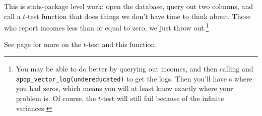 This is stats-package level work: open the database, query out two
columns, and call a $t$-test function that does things
we don't have time to think about. Those who report incomes less than or
equal to zero, we just throw out.\footnote{You may be able to do better
by querying out incomes, and then calling
     and {\tt
    apop\_vector\_log(undereducated)} to get the logs. Then you'll have
    s where you had zeros, which means you will at least
    know exactly where your problem is. Of course, the $t$-test will
    still fail because of the infinite variances.}

See page \pageref{ttest} for more on the $t$-test and this function.

